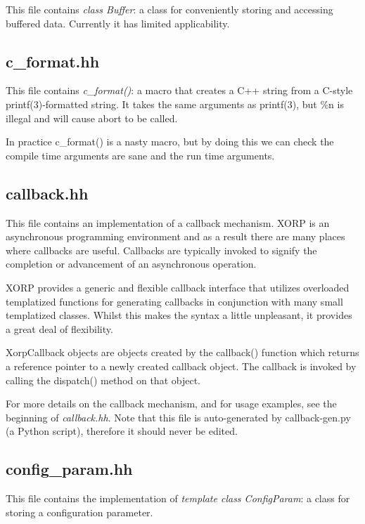 \documentclass[11pt]{article}
\begin{document}
This file contains \emph{class Buffer}: a class for conveniently storing
and accessing buffered data.
Currently it has limited applicability.


\subsection{c\_format.hh}

This file contains \emph{c\_format()}: a macro that creates a C++ string
from a C-style printf(3)-formatted string.
It takes the same arguments as printf(3), but \%n is illegal and
will cause abort to be called.

In practice c\_format() is a nasty macro, but by doing this we can check
the compile time arguments are sane and the run time arguments.


\subsection{callback.hh}

This file contains an implementation of a callback mechanism.
XORP is an asynchronous programming environment and as a result there
are many places where callbacks are useful.  Callbacks are typically
invoked to signify the completion or advancement of an asynchronous
operation.

XORP provides a generic and flexible callback interface that utilizes
overloaded templatized functions for generating callbacks in
conjunction with many small templatized classes. Whilst this makes the
syntax a little unpleasant, it provides a great deal of flexibility.

XorpCallback objects are objects created by the callback()
function which returns a reference pointer to a newly created
callback object.  The callback is invoked by calling the dispatch()
method on that object.

For more details on the callback mechanism, and for usage examples, see
the beginning of \emph{callback.hh}.
Note that this file is auto-generated by callback-gen.py (a Python script),
therefore it should never be edited.

\subsection{config\_param.hh}

This file contains the implementation of \emph{template class
ConfigParam}: a class for storing a configuration parameter.
\end{document}
